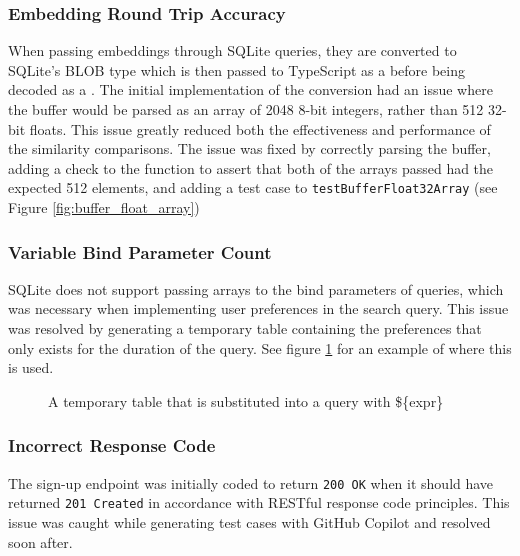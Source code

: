 \subsubsection{Embedding Round Trip Accuracy}\label{sec:embedding_round_trip}
When passing embeddings through SQLite queries, they are converted to SQLite's BLOB type which is then passed to TypeScript as a 
before being decoded as a .
The initial implementation of the conversion had an issue where the buffer would be parsed as an array of 2048 8-bit integers,
rather than 512 32-bit floats. This issue greatly reduced both the effectiveness and performance of the similarity comparisons.
The issue was fixed by correctly parsing the buffer, adding a check to the  function to assert
that both of the arrays passed had the expected 512 elements, and adding a test case to
\texttt{testBufferFloat32Array} (see Figure \ref{fig:buffer_float_array})

\subsubsection{Variable Bind Parameter Count}\label{sec:variable_bind_count}
SQLite does not support passing arrays to the bind parameters of queries, which was
necessary when implementing user preferences in the search query. This issue
was resolved by generating a temporary table containing the preferences
that only exists for the duration of the query. See figure \ref{fig:temp_table_substitution}
for an example of where this is used.

\begin{figure}[h]
    \caption{\label{fig:temp_table_substitution}A temporary table that is substituted into a query with \$\{expr\}}
    \raggedright

\end{figure}

\subsubsection{Incorrect Response Code}
The sign-up endpoint was initially coded to return \texttt{200 OK} when it should have returned
\texttt{201 Created} in accordance with RESTful response code principles. This issue was caught
while generating test cases with GitHub Copilot and resolved soon after.

